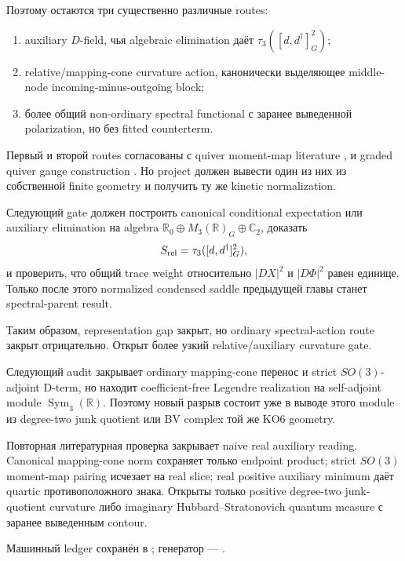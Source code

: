 Поэтому остаются три существенно различные routes:
\begin{enumerate}
 \item auxiliary \(D\)-field, чья algebraic elimination даёт
 \(\tau_3([d,d^\dagger]_G^2)\);
 \item relative/mapping-cone curvature action, канонически выделяющее
 middle-node incoming-minus-outgoing block;
 \item более общий non-ordinary spectral functional с заранее выведенной
 polarization, но без fitted counterterm.
\end{enumerate}

Первый и второй routes согласованы с quiver moment-map literature
,  и graded quiver gauge
construction . Но project должен вывести один из них
из собственной finite geometry и получить ту же kinetic normalization.

\begin{protocol}
Следующий gate должен построить canonical conditional expectation или
auxiliary elimination на algebra
\(\mathbb R_0\oplus M_3(\mathbb R)_G\oplus\mathbb C_2\), доказать
\begin{equation}
 S_{\rm rel}=\tau_3([d,d^\dagger]_G^2),
\end{equation}
и проверить, что общий trace weight относительно \(|D X|^2\) и
\(|D\Phi|^2\) равен единице. Только после этого normalized condensed saddle
предыдущей главы станет spectral-parent result.
\end{protocol}

Таким образом, representation gap закрыт, но ordinary spectral-action route
закрыт отрицательно. Открыт более узкий relative/auxiliary curvature gate.

Следующий audit закрывает ordinary mapping-cone перенос и strict
\(SO(3)\)-adjoint D-term, но находит coefficient-free Legendre realization
на self-adjoint module \(\operatorname{Sym}_3(\mathbb R)\). Поэтому новый
разрыв состоит уже в выводе этого module из degree-two junk quotient или BV
complex той же KO6 geometry.

Повторная литературная проверка закрывает naive real auxiliary reading.
Canonical mapping-cone norm сохраняет только endpoint product; strict
\(SO(3)\) moment-map pairing исчезает на real slice; real positive
auxiliary minimum даёт quartic противоположного знака. Открыты только
positive degree-two junk-quotient curvature либо imaginary
Hubbard--Stratonovich quantum measure с заранее выведенным contour.

Машинный ledger сохранён в
;
генератор ---
.
